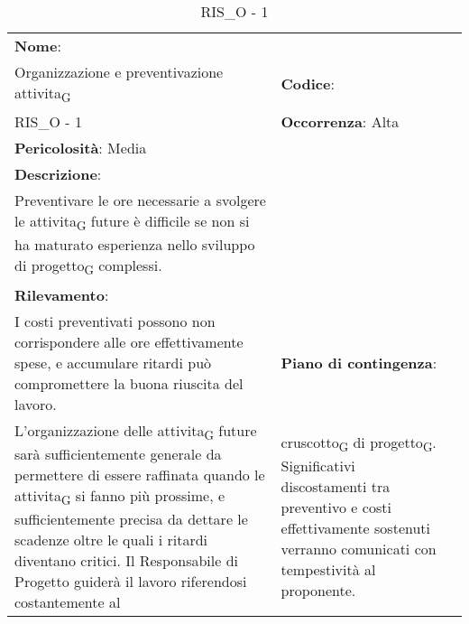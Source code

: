\renewcommand{\arraystretch}{1.5}
\begin{longtable} { 
		>{\raggedright}p{} 
		>{\raggedright}p{} 
		>{\raggedright}p{}    }
	
	\caption{RIS\_O - 1} \endhead	
	
	
	\textbf{Nome}: \\ Organizzazione e preventivazione attivita\textsubscript{G}
	& \textbf{Codice}: \\ RIS\_O - 1
	& \textbf{Occorrenza}: Alta \\ \textbf{Pericolosità}: Media
	
	\tabularnewline
	
	\textbf{Descrizione}: \\ Preventivare le ore necessarie a svolgere le attivita\textsubscript{G} future è difficile se non si ha maturato esperienza nello sviluppo di progetto\textsubscript{G} complessi. \\
	\textbf{Rilevamento}: \\ I costi preventivati possono non corrispondere alle ore effettivamente spese, e accumulare ritardi può compromettere la buona riuscita del lavoro.
	& 
	\textbf{Piano di contingenza}: \\ L'organizzazione delle attivita\textsubscript{G} future sarà sufficientemente generale da permettere di essere raffinata quando le attivita\textsubscript{G} si fanno più prossime, e sufficientemente precisa da dettare le scadenze oltre le quali i ritardi diventano critici. Il Responsabile di Progetto guiderà il lavoro riferendosi costantemente al 
	&  
	cruscotto\textsubscript{G} di progetto\textsubscript{G}. Significativi discostamenti tra preventivo e costi effettivamente sostenuti verranno comunicati con tempestività al proponente.
	
\end{longtable}



